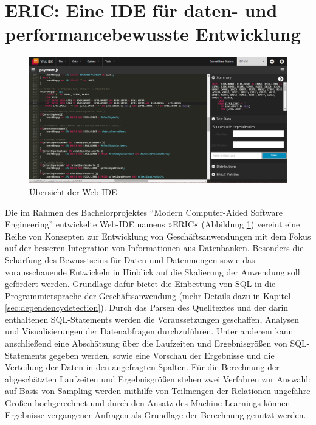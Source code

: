 \section{ERIC: Eine IDE f{\"u}r daten- und performancebewusste Entwicklung}\label{chap:entwicklungsumgebung}

%
%

\begin{figure}[ht]
	\centering
  \includegraphics[width=1\textwidth]{figures/ide.png}
	\caption{Übersicht der Web-IDE}
	\label{fig:ide}
\end{figure}

Die im Rahmen des Bachelorprojektes ``Modern Computer-Aided Software Engineering'' entwickelte Web-IDE namens »ERIC« (Abbildung \ref{fig:ide}) vereint eine Reihe von Konzepten zur Entwicklung von Geschäftsanwendungen mit dem Fokus auf der besseren Integration von Informationen aus Datenbanken.
Besonders die Schärfung des Bewusstseins für Daten und Datenmengen sowie das vorausschauende Entwickeln in Hinblick auf die Skalierung der Anwendung soll gefördert werden.
Grundlage dafür bietet die Einbettung von SQL in die Programmiersprache der Geschäftsanwendung \cite{Horschig2014} (mehr Details dazu in Kapitel \ref{sec:dependencydetection}).
Durch das Parsen des Quelltextes \cite{Horschig2014} und der darin enthaltenen SQL-Statements \cite{Schulz2014} werden die Voraussetzungen geschaffen, Analysen und Visualisierungen der Datenabfragen durchzuführen.
Unter anderem kann anschließend eine Abschätzung über die Laufzeiten und Ergebnisgrößen von SQL-Statements gegeben werden, sowie eine Vorschau der Ergebnisse und die Verteilung der Daten in den angefragten Spalten.
Für die Berechnung der abgeschätzten Laufzeiten und Ergebnisgrößen stehen zwei Verfahren zur Auswahl: auf Basis von Sampling \cite{Exner2014} werden mithilfe von Teilmengen der Relationen ungefähre Größen hochgerechnet und durch den Ansatz des Machine Learnings \cite{Mues2014} können Ergebnisse vergangener Anfragen als Grundlage der Berechnung genutzt werden.

